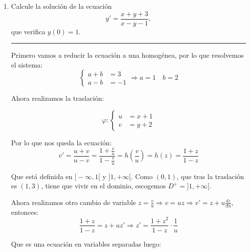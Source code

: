 \documentclass[12pt]{article}
\newcommand{\solution}[1]{\text{\fbox{$#1$}}}
\DeclareMathOperator\arctanh{arctanh}
\begin{document}
\begin{enumerate}
Podemos aplicar variables separadas:
\[
\frac{dv}{dt}=-\frac{k}{m}v^2+g\Longrightarrow \int\frac{dv}{-\frac{k}{m}v^2+g}=\int dt \Longrightarrow \frac{1}{g} \int\frac{dv}{-\frac{k}{mg}v^2+1}=\int dt
\]

Por simplicidad, hacemos $\alpha=\frac{k}{mg}$:
\[
\frac{1}{g}\int\frac{dv}{1-(\frac{v}{\alpha})^2}=\frac{\sqrt{\alpha}}{g}\arctanh\left(\frac{v}{\sqrt{\alpha}}\right) =t+C \Longrightarrow v =\sqrt{\alpha}\tanh\left((t+C)\frac{g}{\sqrt{\alpha}}\right)
\]

Usando la condición inicial $v(0)=0$ tenemos que $C=0$. Por lo que nos queda, en explícitas:
\[
v =\sqrt{\alpha}\tanh\left(\frac{tg}{\sqrt{\alpha}}\right) \Longrightarrow \solution{ v(t) =\sqrt{\alpha}\tanh\left(\frac{tg}{\sqrt{\alpha}}\right) }
\]

Y si queremos saber el comportamiento a largo plazo, hacemos $t\longrightarrow +\infty$ obteniendo que: 
\[
\solution{\displaystyle \lim_{t \to \infty}v(t)=\sqrt{\alpha}=\sqrt{\frac{k}{mg}}}
\]

\hrule
\item Calcule la solución de la ecuación
\[
y'=\frac{x+y+3}{x-y-1},
\]
que verifica $y(0)=1$.
\hrule

Primero vamos a reducir la ecuación a una homogénea, por lo que resolvemos el sistema:
$$
\left \{ \begin{array}{ll}
a + b & = 3 \\
a - b & = -1
\end{array}
\right. \Longrightarrow a=1 \quad b=2
$$

Ahora realizamos la traslación:

\[
\varphi : \left \{ \begin{array}{ll}
u & = x+1 \\
v & = y+2
\end{array}
\right. 
\]

Por lo que nos queda la ecuación:
\[
v'=\frac{u+v}{u-v}=\frac{1+\frac{v}{u}}{1-\frac{v}{u}}=h\left(\frac{v}{u}\right)=h(z)=\frac{1+z}{1-z}
\]

Que está definida en $]-\infty, 1[$ y $]1,+\infty[$. Como $(0,1)$, que tras la traslación es $(1,3)$, tiene que vivir en el dominio, escogemos $D^+=]1,+\infty[$.

Ahora realizamos otro cambio de variable $z=\frac{v}{u} \Longrightarrow v=uz \Longrightarrow v'=z+u\frac{dz}{du}$, entonces:
\[
\frac{1+z}{1-z}=z+uz' \Longrightarrow z'=\frac{1+z^2}{1-z}\cdot\frac{1}{u}
\]

Que es una ecuación en variables separadas luego:


\end{enumerate}
\end{document}
